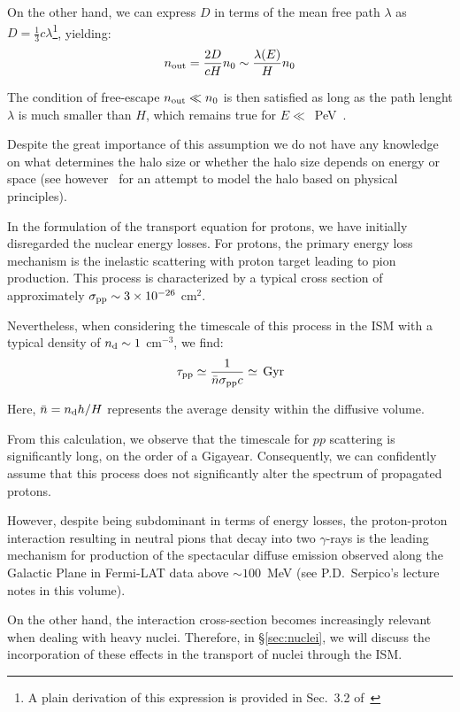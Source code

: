 On the other hand, we can express $D$ in terms of the mean free path $\lambda$ as $D = \frac{1}{3} c \lambda$\footnote{A plain  derivation of this expression is provided in Sec.~3.2 of~\cite{Kachelriess2008arxiv}}, yielding:
%
\begin{equation}
n_{\rm out} = \frac{2D}{cH} n_0 \sim \frac{\lambda(E)}{H} n_0 %
\end{equation}

The condition of free-escape $n_{\rm out} \ll n_0$ is then satisfied as long as the path lenght $\lambda$ is much smaller than $H$, which remains true for $E \ll $~PeV~\cite{Blasi2019prl}. 

Despite the great importance of this assumption we do not have any knowledge on what determines the halo size or whether the halo size depends on energy or space (see however~\cite{Evoli2018prl,Dogiel2020apj} for an attempt to model the halo based on physical principles).

In the formulation of the transport equation for protons, we have initially disregarded the nuclear energy losses. For protons, the primary energy loss mechanism is the inelastic scattering with proton target leading to pion production. This process is characterized by a typical cross section of approximately $\sigma_{\rm pp}\sim 3\times 10^{-26}$ cm$^2$.

Nevertheless, when considering the timescale of this process in the ISM with a typical density of $n_{\rm d} \sim 1$ cm$^{-3}$, we find:
%
\begin{equation}
\tau_{\rm pp} \simeq \frac{1}{\bar{n}\sigma_{\rm pp}c} \simeq \, \text{Gyr}
\end{equation}

Here, $\bar{n} = n_{\rm d} h/H$ represents the average density within the diffusive volume.

From this calculation, we observe that the timescale for $pp$ scattering is significantly long, on the order of a Gigayear. Consequently, we can confidently assume that this process does not significantly alter the spectrum of propagated protons. 

However, despite being subdominant in terms of energy losses, the proton-proton interaction resulting in neutral pions that decay into two $\gamma$-rays is the leading mechanism for production of the spectacular diffuse emission observed along the Galactic Plane in Fermi-LAT data above $\sim 100$~MeV (see P.D.~Serpico's lecture notes in this volume).

On the other hand, the interaction cross-section becomes increasingly relevant when dealing with heavy nuclei. Therefore, in \S\ref{sec:nuclei}, we will discuss the incorporation of these effects in the transport of nuclei through the ISM.

